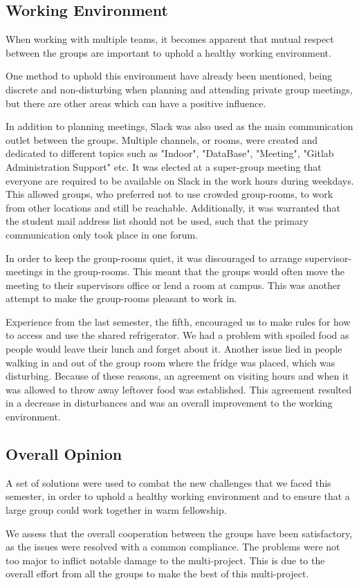 \subsection*{Working Environment}
When working with multiple teams, it becomes apparent that mutual respect between the groups are important to uphold a healthy working environment.

One method to uphold this environment have already been mentioned, being discrete and non-disturbing when planning and attending private group meetings, but there are other areas which can have a positive influence. 

In addition to planning meetings, Slack was also used as the main communication outlet between the groups. Multiple channels, or rooms, were created and dedicated to different topics such as "Indoor", "DataBase", "Meeting", "Gitlab Administration Support" etc. It was elected at a super-group meeting that everyone are required to be available on Slack in the work hours during weekdays. This allowed groups, who preferred not to use crowded group-rooms, to work from other locations and still be reachable. Additionally, it was warranted that the student mail address list should not be used, such that the primary communication only took place in one forum.  

In order to keep the group-rooms quiet, it was discouraged to arrange supervisor-meetings in the group-rooms. This meant that the groups would often move the meeting to their supervisors office or lend a room at campus. This was another attempt to make the group-rooms pleasant to work in.

Experience from the last semester, the fifth, encouraged us to make rules for how to access and use the shared refrigerator. We had a problem with spoiled food as people would leave their lunch and forget about it. Another issue lied in people walking in and out of the group room where the fridge was placed, which was disturbing. Because of these reasons, an agreement on visiting hours and when it was allowed to throw away leftover food was established. This agreement resulted in a decrease in disturbances and was an overall improvement to the working environment. 

\subsection*{Overall Opinion}
A set of solutions were used to combat the new challenges that we faced this semester, in order to uphold a healthy working environment and to ensure that a large group could work together in warm fellowship.

We assess that the overall cooperation between the groups have been satisfactory, as the issues were resolved with a common compliance. The problems were not too major to inflict notable damage to the multi-project. This is due to the overall effort from all the groups to make the best of this multi-project.
